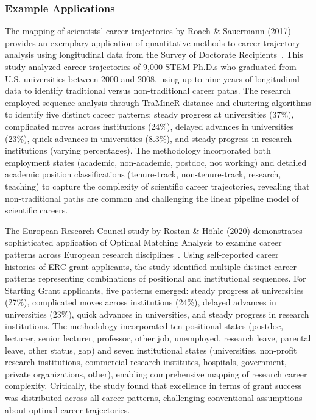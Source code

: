 \documentclass[main.tex]{subfiles}
\begin{document}
\subsubsection{Example Applications}

The mapping of scientists' career trajectories by Roach \& Sauermann (2017) provides an exemplary application of quantitative methods to career trajectory analysis using longitudinal data from the Survey of Doctorate Recipients~\parencite{scientists_trajectories}. This study analyzed career trajectories of 9,000 STEM Ph.D.s who graduated from U.S. universities between 2000 and 2008, using up to nine years of longitudinal data to identify traditional versus non-traditional career paths. The research employed sequence analysis through TraMineR distance and clustering algorithms to identify five distinct career patterns: steady progress at universities (37\%), complicated moves across institutions (24\%), delayed advances in universities (23\%), quick advances in universities (8.3\%), and steady progress in research institutions (varying percentages). The methodology incorporated both employment states (academic, non-academic, postdoc, not working) and detailed academic position classifications (tenure-track, non-tenure-track, research, teaching) to capture the complexity of scientific career trajectories, revealing that non-traditional paths are common and challenging the linear pipeline model of scientific careers.

The European Research Council study by Rostan \& Höhle (2020) demonstrates sophisticated application of Optimal Matching Analysis to examine career patterns across European research disciplines~\parencite{career_patterns_europe}. Using self-reported career histories of ERC grant applicants, the study identified multiple distinct career patterns representing combinations of positional and institutional sequences. For Starting Grant applicants, five patterns emerged: steady progress at universities (27\%), complicated moves across institutions (24\%), delayed advances in universities (23\%), quick advances in universities, and steady progress in research institutions. The methodology incorporated ten positional states (postdoc, lecturer, senior lecturer, professor, other job, unemployed, research leave, parental leave, other status, gap) and seven institutional states (universities, non-profit research institutions, commercial research institutes, hospitals, government, private organizations, other), enabling comprehensive mapping of research career complexity. Critically, the study found that excellence in terms of grant success was distributed across all career patterns, challenging conventional assumptions about optimal career trajectories.
\end{document}
